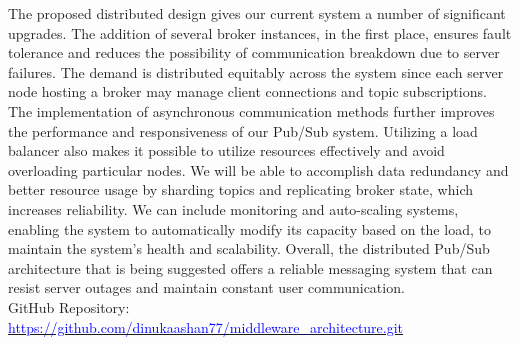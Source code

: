 \documentclass[12pt]{article}
\begin{document}
The proposed distributed design gives our current system a number of significant upgrades. The addition of several broker instances, in the first place, ensures fault tolerance and reduces the possibility of communication breakdown due to server failures. The demand is distributed equitably across the system since each server node hosting a broker may manage client connections and topic subscriptions. The implementation of asynchronous communication methods further improves the performance and responsiveness of our Pub/Sub system. Utilizing a load balancer also makes it possible to utilize resources effectively and avoid overloading particular nodes. We will be able to accomplish data redundancy and better resource usage by sharding topics and replicating broker state, which increases reliability. We can include monitoring and auto-scaling systems, enabling the system to automatically modify its capacity based on the load, to maintain the system's health and scalability. Overall, the distributed Pub/Sub architecture that is being suggested offers a reliable messaging system that can resist server outages and maintain constant user communication. \\

\noindent
GitHub Repository: \href{https://github.com/dinukaashan77/middleware_architecture.git}{\textcolor{blue}{https://github.com/dinukaashan77/middleware\_architecture.git}}
\end{document}
